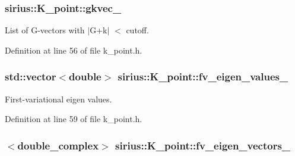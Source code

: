 \subsubsection[{gkvec\+\_\+}]{ sirius\+::\+K\+\_\+point\+::gkvec\+\_\+\hspace{0.3cm}{\ttfamily [private]}}\label{classsirius_1_1_k__point_aa35c8c7b4c50603dcdd68267a0f5214f}


List of G-\/vectors with $\vert$\+G+k$\vert$ $<$ cutoff. 



Definition at line 56 of file k\+\_\+point.\+h.

\hypertarget{classsirius_1_1_k__point_a14dcb7159c34100962ccbe6f56a5a195}{}
\subsubsection[{fv\+\_\+eigen\+\_\+values\+\_\+}]{\setlength{\rightskip}{0pt plus 5cm}std\+::vector$<$double$>$ sirius\+::\+K\+\_\+point\+::fv\+\_\+eigen\+\_\+values\+\_\+\hspace{0.3cm}{\ttfamily [private]}}\label{classsirius_1_1_k__point_a14dcb7159c34100962ccbe6f56a5a195}


First-\/variational eigen values. 



Definition at line 59 of file k\+\_\+point.\+h.

\hypertarget{classsirius_1_1_k__point_a4dce601feff0bf4382d7089ee88cf9ea}{}
\subsubsection[{fv\+\_\+eigen\+\_\+vectors\+\_\+}]{$<$double\+\_\+complex$>$ sirius\+::\+K\+\_\+point\+::fv\+\_\+eigen\+\_\+vectors\+\_\+\hspace{0.3cm}{\ttfamily [private]}}\label{classsirius_1_1_k__point_a4dce601feff0bf4382d7089ee88cf9ea}


